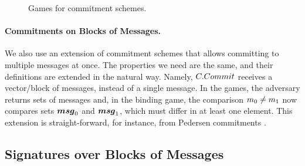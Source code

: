\begin{figure}[ht!]
  \begin{minipage}[t]{0.5\textwidth}
  \end{minipage}
  \begin{minipage}[t]{0.5\textwidth}
  \end{minipage}
  \label{fig:com-games}
  \caption{Games for commitment schemes.}
\end{figure}

\paragraph{Commitments on Blocks of Messages.} We also use an extension
of commitment schemes that allows committing to multiple messages at once. The
properties we need are the same, and their definitions are extended in the
natural way. Namely, $C.Commit$ receives a vector/block of messages, \msgset
instead of a single message. In the games, the adversary returns sets of
messages and, in the binding game, the comparison $m_0 \neq m_1$ now
compares sets $\boldsymbol{msg}_0$ and $\boldsymbol{msg}_1$, which must differ in at least one
element. This extension is straight-forward, for instance, from Pedersen
commitments \cite{bcc+15}.

\subsection{Signatures over Blocks of Messages}
\label{sapp:sbm}


